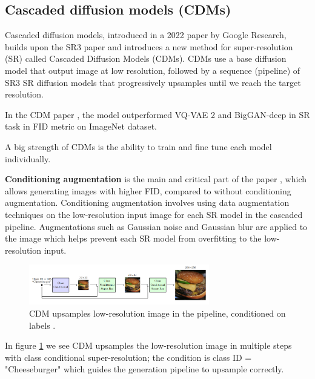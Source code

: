 \subsection{Cascaded diffusion models (CDMs)}

Cascaded diffusion models, introduced in a 2022 paper \cite{cascaded_diffusion_models} by Google Research, builds upon the SR3 paper \cite{sr3} and introduces a new method for super-resolution (SR) called Cascaded Diffusion Models (CDMs). CDMs use a base diffusion model that output image at low resolution, followed by a sequence (pipeline) of SR3 SR diffusion models that progressively upsamples until we reach the target resolution.

In the CDM paper \cite{cascaded_diffusion_models}, the model outperformed VQ-VAE 2 \cite{vqvae2} and BigGAN-deep \cite{biggan_deep} in SR task in FID metric on ImageNet dataset.

A big strength of CDMs is the ability to train and fine tune each model individually.

\textbf{Conditioning augmentation} is the main and critical part of the paper \cite{cascaded_diffusion_models}, which allows generating images with higher FID, compared to without conditioning augmentation. Conditioning augmentation involves using data augmentation techniques on the low-resolution input image for each SR model in the cascaded pipeline. Augmentations such as Gaussian noise and Gaussian blur are applied to the image which helps prevent each SR model from overfitting to the low-resolution input.

\begin{figure}
    \centering
    \includegraphics[width=0.7\textwidth]{images/imagen/cdm_architecture.png}
    \caption{CDM upsamples low-resolution image in the pipeline, conditioned on labels \cite{cascaded_diffusion_models}.}
    \label{fig:imagen_cdm_architecture}
\end{figure}

In figure \ref{fig:imagen_cdm_architecture} we see CDM upsamples the low-resolution image in multiple steps with class conditional super-resolution; the condition is class ID = "Cheeseburger" which guides the generation pipeline to upsample correctly.























